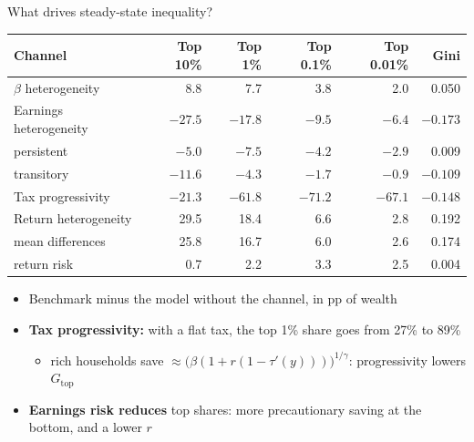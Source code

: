 \documentclass[10pt,english,10pt,handout]{beamer}
\begin{document}
\begin{frame}{What drives steady-state inequality?}
\begin{center}
\footnotesize
\setlength{\tabcolsep}{4pt}
\begin{tabular}{lrrrrr}
\toprule
Channel & Top 10\% & Top 1\% & Top 0.1\% & Top 0.01\% & Gini\\
\midrule
$\beta$ heterogeneity & 8.8 & 7.7 & 3.8 & 2.0 & 0.050\\
Earnings heterogeneity & $-27.5$ & $-17.8$ & $-9.5$ & $-6.4$ & $-0.173$\\
\quad persistent & $-5.0$ & $-7.5$ & $-4.2$ & $-2.9$ & 0.009\\
\quad transitory & $-11.6$ & $-4.3$ & $-1.7$ & $-0.9$ & $-0.109$\\
Tax progressivity & $-21.3$ & $-61.8$ & $-71.2$ & $-67.1$ & $-0.148$\\
Return heterogeneity & 29.5 & 18.4 & 6.6 & 2.8 & 0.192\\
\quad mean differences & 25.8 & 16.7 & 6.0 & 2.6 & 0.174\\
\quad return risk & 0.7 & 2.2 & 3.3 & 2.5 & 0.004\\
\bottomrule
\end{tabular}
\end{center}
{\small
\begin{itemize}
\item Benchmark minus the model without the channel, in pp of wealth
\item \textbf{Tax progressivity:} with a flat tax, the top 1\% share goes from 27\% to 89\%
\begin{itemize}
\item rich households save $\approx\big(\beta(1+r(1-\tau'(y)))\big)^{1/\gamma}$: progressivity lowers $G_{\text{top}}$
\end{itemize}
\item \textbf{Earnings risk reduces} top shares: more precautionary saving at the bottom, and a lower $r$
\end{itemize}}
\end{frame}
\end{document}
